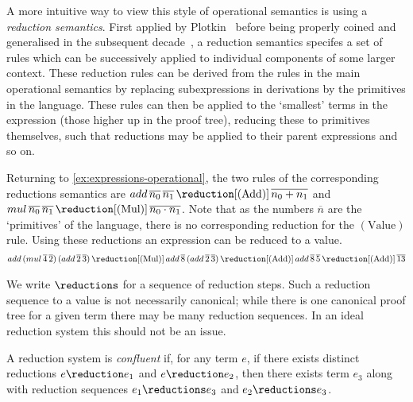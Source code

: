 A more intuitive way to view this style of operational semantics is using
a \emph{reduction semantics}.
First applied by Plotkin~\cite{plotkin1975callbyname} before being properly
coined and generalised in the subsequent
decade~\cite{felleisen1987reduction,felleisen1987calculi}, a reduction semantics
specifes a set of rules which can be successively applied to individual
components of some larger context. These reduction rules can be derived from
the rules in the main operational semantics by replacing subexpressions in
derivations by the primitives in the language.
These rules can then be applied to the `smallest' terms in the expression
(those higher up in the proof tree), reducing these to primitives themselves,
such that reductions may be applied to their parent expressions and so on.

\begin{example}\label{ex:expressions-reduction}
    Returning to \cref{ex:expressions-operational}, the two rules of the
    corresponding reductions semantics are \(
    add \, \overline{n_0} \, \overline{n_1}
    \,\reduction[(\text{Add})]\,
    \overline{n_0 + n_1}
    \) and \(
    mul \, \overline{n_0} \, \overline{n_1}
    \,\reduction[(\text{Mul})]\,
    \overline{n_0 \cdot n_1}
    \).
    Note that as the numbers \(\overline{n}\) are the `primitives' of the
    language, there is no corresponding reduction for the \((\text{Value})\)
    rule.
    Using these reductions an expression can be reduced to a value.
    \begin{gather*}
        add \, (mul \, \overline{4} \, \overline{2}) \, (add \, \overline{2} \, \overline{3})
        \,\reduction[(\text{Mul})]\,
        add \, \overline{8} \, (add \, \overline{2} \, \overline{3})
        \,\reduction[(\text{Add})]\,
        add \, \overline{8} \, \overline{5}
        \,\reduction[(\text{Add})]\,
        \overline{13}
    \end{gather*}
\end{example}

We write \(\reductions\) for a sequence of reduction steps.
Such a reduction sequence to a value is not necessarily canonical; while there
is one canonical proof tree for a given term there may be many reduction
sequences.
In an ideal reduction system this should not be an issue.

\begin{definition}
    A reduction system is \emph{confluent} if, for any term \(e\), if there
    exists distinct reductions \(e \reduction e_1\) and \(e \reduction e_2\),
    then there exists term \(e_3\) along with reduction sequences
    \(e_1 \reductions e_3\) and \(e_2 \reductions e_3\).
\end{definition}

